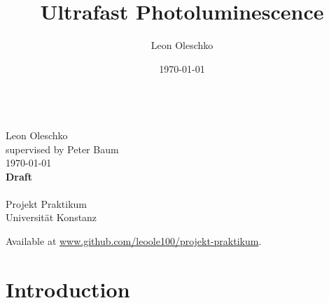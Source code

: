 \documentclass[
	parskip=half,
	a4paper,
]{scrarticle}
\begin{document}
\title{Ultrafast Photoluminescence}
\author{Leon Oleschko}
\date{\dotdate\today}

\begin{titlepage}
    \sffamily
    \vspace*{3cm}
    {
        \fontsize{32}{32}
    }
    \vspace{.25cm}\\
    {
        \Large
        Leon Oleschko\\
        supervised by Peter Baum
        \vspace{.05cm}\\
        \dotdate\today\\
        \textbf{Draft}\\
        \vspace{.05cm}\\
        \normalsize
        Projekt Praktikum\\
        Universität Konstanz
    }
    \vfill
    {
        \normalfont\normalsize
    }
    \vfill
    \begin{flushright}
        Available at \url{www.github.com/leoole100/projekt-praktikum}.
    \end{flushright}
\end{titlepage}


\clearpage

\section{Introduction}


\clearpage
\end{document}
